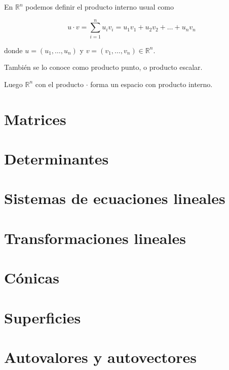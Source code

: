 \begin{example}

En $ \mathbb{R}^n$ podemos definir el producto interno usual como

$$ u \cdot v = \sum_{i=1}^n u_i v_i = u_1 v_1 + u_2 v_2 + \ldots + u_n v_n$$

donde $ u=(u_1, \ldots, u_n)$ y $ v = (v_1, \ldots, v_n) \in \mathbb{R}^n$.

También se lo conoce como producto punto, o producto escalar.

Luego $\mathbb{R}^n$ con el producto $\cdot$ forma un espacio con producto interno.  
\end{example}


\chapter{Matrices}

\chapter{Determinantes}

\chapter{Sistemas de ecuaciones lineales}

\chapter{Transformaciones lineales}

\chapter{Cónicas}

\chapter{Superficies}

\chapter{Autovalores y autovectores}


